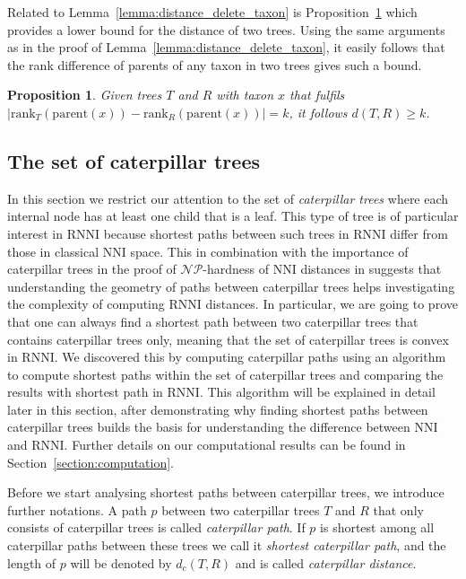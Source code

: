 \documentclass{amsart}
\newcommand{\np}{\mathcal{NP}}
\newcommand{\parent}{\mathrm{parent}}
\newcommand{\rank}{\mathrm{rank}}
\newcommand{\nni}{\mathrm{NNI}}
\newcommand{\rnni}{\mathrm{RNNI}}
\newtheorem{proposition}[definition]{Proposition}
\begin{document}
Related to Lemma~\ref{lemma:distance_delete_taxon} is Proposition~\ref{proposition:lower_bound_distance} which provides a lower bound for the distance of two trees.
Using the same arguments as in the proof of Lemma~\ref{lemma:distance_delete_taxon}, it easily follows that the rank difference of parents of any taxon in two trees gives such a bound.

\begin{proposition}
    Given trees $T$ and $R$ with taxon $x$ that fulfils $|\rank_T(\parent(x)) - \rank_R(\parent(x))| = k$, it follows $d(T,R) \geq k$.
    \label{proposition:lower_bound_distance}
\end{proposition}

\subsection{The set of caterpillar trees}
\label{section:caterpillar_convex}

In this section we restrict our attention to the set of \emph{caterpillar trees} where each internal node has at least one child that is a leaf.
This type of tree is of particular interest in $\rnni$ because shortest paths between such trees in $\rnni$ differ from those in classical $\nni$ space.
This in combination with the importance of caterpillar trees in the proof of $\np$-hardness of $\nni$ distances in \autocite{jiang2000} suggests that understanding the geometry of paths between caterpillar trees helps investigating the complexity of computing $\rnni$ distances.
In particular, we are going to prove that one can always find a shortest path between two caterpillar trees that contains caterpillar trees only, meaning that the set of caterpillar trees is convex in $\rnni$.
We discovered this by computing caterpillar paths using an algorithm to compute shortest paths within the set of caterpillar trees and comparing the results with shortest path in $\rnni$.
This algorithm will be explained in detail later in this section, after demonstrating why finding shortest paths between caterpillar trees builds the basis for understanding the difference between $\nni$ and $\rnni$.
Further details on our computational results can be found in Section~\ref{section:computation}.

Before we start analysing shortest paths between caterpillar trees, we introduce further notations.
A path $p$ between two caterpillar trees $T$ and $R$ that only consists of caterpillar trees is called \emph{caterpillar path}.
If $p$ is shortest among all caterpillar paths between these trees we call it \emph{shortest caterpillar path}, and the length of $p$ will be denoted by $d_c(T,R)$ and is called \emph{caterpillar distance}.
\end{document}
